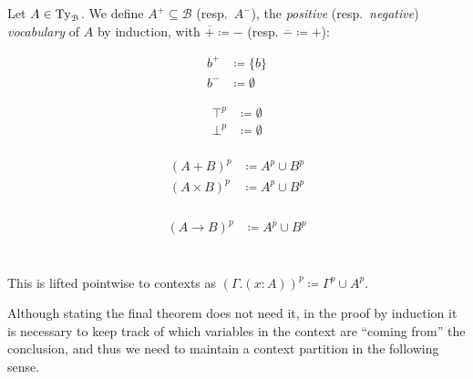 \documentclass[a4paper,UKenglish,cleveref, autoref, thm-restate]{lipics-v2021}
\begin{document}
\begin{definition}
  Let \(A \in \Ty_{\mathcal{B}}\). We define \(A^+ \subseteq \mathcal{B}\)
    (resp.\ \(A^-\)), the \emph{positive}
    (resp.\ \emph{negative}) \emph{vocabulary} of \(A\) by induction,
    with $\overline{+}\coloneq -$ (resp. $\overline{-} \coloneq+$):\\[-1.5em]
  \begin{minipage}[t]{0.15\textwidth}
  \begin{align*}
    b^{+} & \coloneq \{b\} \\
    b^{-} & \coloneq \emptyset
  \end{align*}
  \end{minipage}
  \begin{minipage}[t]{0.15\textwidth}
  \begin{align*}
    \top^p & \coloneq \emptyset \\
    \bot^p & \coloneq \emptyset \\
  \end{align*}
  \end{minipage}
  \begin{minipage}[t]{0.25\textwidth}
  \begin{align*}
    (A + B)^{p} & \coloneq A^p \cup B^p \\
    (A \times B)^{p} & \coloneq A^p \cup B^p \\
  \end{align*}
  \end{minipage}
  \begin{minipage}[t]{0.2\textwidth}
  \begin{align*}
    (A \to B)^{p} & \coloneq A^{\overline{p}} \cup B^p \\
  \end{align*}
  \end{minipage}\\
This is lifted pointwise to contexts as
  \((\Gamma.(x : A))^p \coloneq \Gamma^p \cup A^p\).
\end{definition}

Although stating the final theorem does not need it, in the proof by induction
it is necessary to keep track of which variables in the context are ``coming from''
the conclusion, and thus we need to maintain a context partition in the following sense.
\end{document}
